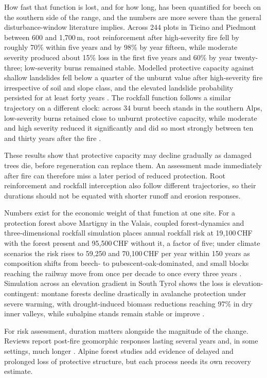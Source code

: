 \documentclass[11pt,a4paper]{article}
\begin{document}
How fast that function is lost, and for how long, has been quantified for beech on the southern side of the range, and the numbers are more severe than the general disturbance-window literature implies. Across 244 plots in Ticino and Piedmont between 600 and 1{,}700\,m, root reinforcement after high-severity fire fell by roughly 70\% within five years and by 98\% by year fifteen, while moderate severity produced about 15\% loss in the first five years and 60\% by year twenty-three; low-severity burns remained stable. Modelled protective capacity against shallow landslides fell below a quarter of the unburnt value after high-severity fire irrespective of soil and slope class, and the elevated landslide probability persisted for at least forty years \citep{gehring_shallow_2019}. The rockfall function follows a similar trajectory on a different clock: across 34 burnt beech stands in the southern Alps, low-severity burns retained close to unburnt protective capacity, while moderate and high severity reduced it significantly and did so most strongly between ten and thirty years after the fire \citep{maringer_temporal_2016}.

These results show that protective capacity may decline gradually as damaged trees die, before regeneration can replace them. An assessment made immediately after fire can therefore miss a later period of reduced protection. Root reinforcement and rockfall interception also follow different trajectories, so their durations should not be equated with shorter runoff and erosion responses.

Numbers exist for the economic weight of that function at one site. For a protection forest above Martigny in the Valais, coupled forest-dynamics and three-dimensional rockfall simulation places annual rockfall risk at 19{,}100\,CHF with the forest present and 95{,}500\,CHF without it, a factor of five; under climate scenarios the risk rises to 59{,}250 and 70{,}100\,CHF per year within 150 years as composition shifts from beech- to pubescent-oak-dominated, and small blocks reaching the railway move from once per decade to once every three years \citep{moos_climate_2021}. Simulation across an elevation gradient in South Tyrol shows the loss is elevation-contingent: montane forests decline drastically in avalanche protection under severe warming, with drought-induced biomass reductions reaching 97\% in dry inner valleys, while subalpine stands remain stable or improve \citep{hillebrand_contrasting_2023}.

For risk assessment, duration matters alongside the magnitude of the change. Reviews report post-fire geomorphic responses lasting several years and, in some settings, much longer \citep{santi_wildfire_2022}. Alpine forest studies add evidence of delayed and prolonged loss of protective structure, but each process needs its own recovery estimate.
\end{document}
